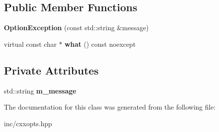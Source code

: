\subsection*{Public Member Functions}
\begin{DoxyCompactItemize}
\item 
{\bfseries Option\+Exception} (const std\+::string \&message)\hypertarget{classcxxopts_1_1OptionException_a7cdfbb519a58e5432e3e8444f75f0917}{}\label{classcxxopts_1_1OptionException_a7cdfbb519a58e5432e3e8444f75f0917}

\item 
virtual const char $\ast$ {\bfseries what} () const noexcept\hypertarget{classcxxopts_1_1OptionException_a9c5d051abc68dca63d71ecdaec476fbf}{}\label{classcxxopts_1_1OptionException_a9c5d051abc68dca63d71ecdaec476fbf}

\end{DoxyCompactItemize}
\subsection*{Private Attributes}
\begin{DoxyCompactItemize}
\item 
std\+::string {\bfseries m\+\_\+message}\hypertarget{classcxxopts_1_1OptionException_aff1460a5b83bee97c0343c9b85c4c81c}{}\label{classcxxopts_1_1OptionException_aff1460a5b83bee97c0343c9b85c4c81c}

\end{DoxyCompactItemize}


The documentation for this class was generated from the following file\+:\begin{DoxyCompactItemize}
\item 
inc/cxxopts.\+hpp\end{DoxyCompactItemize}
